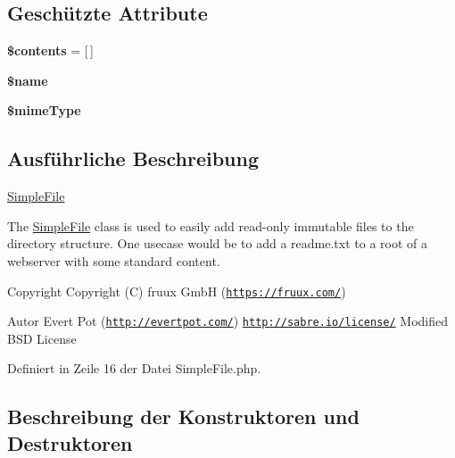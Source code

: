 \subsection*{Geschützte Attribute}
\begin{DoxyCompactItemize}
\item 
\mbox{\label{class_sabre_1_1_d_a_v_1_1_simple_file_af5d250411cdba12dde5421274e920003}} 
{\bfseries \$contents} = \mbox{[}$\,$\mbox{]}
\item 
\mbox{\label{class_sabre_1_1_d_a_v_1_1_simple_file_a6d077c521600c1e37cb506ee87d804a8}} 
{\bfseries \$name}
\item 
\mbox{\label{class_sabre_1_1_d_a_v_1_1_simple_file_a7ff442e80e374346f202b544a41eb1e7}} 
{\bfseries \$mime\+Type}
\end{DoxyCompactItemize}


\subsection{Ausführliche Beschreibung}
\mbox{\hyperlink{class_sabre_1_1_d_a_v_1_1_simple_file}{Simple\+File}}

The \textquotesingle{}\mbox{\hyperlink{class_sabre_1_1_d_a_v_1_1_simple_file}{Simple\+File}}\textquotesingle{} class is used to easily add read-\/only immutable files to the directory structure. One usecase would be to add a \textquotesingle{}readme.\+txt\textquotesingle{} to a root of a webserver with some standard content.

\begin{DoxyCopyright}{Copyright}
Copyright (C) fruux GmbH (\href{https://fruux.com/}{\tt https\+://fruux.\+com/}) 
\end{DoxyCopyright}
\begin{DoxyAuthor}{Autor}
Evert Pot (\href{http://evertpot.com/}{\tt http\+://evertpot.\+com/})  \href{http://sabre.io/license/}{\tt http\+://sabre.\+io/license/} Modified B\+SD License 
\end{DoxyAuthor}


Definiert in Zeile 16 der Datei Simple\+File.\+php.



\subsection{Beschreibung der Konstruktoren und Destruktoren}
\mbox{\label{class_sabre_1_1_d_a_v_1_1_simple_file_a3111b71269992632d6ef977c9167ddf3}} 
